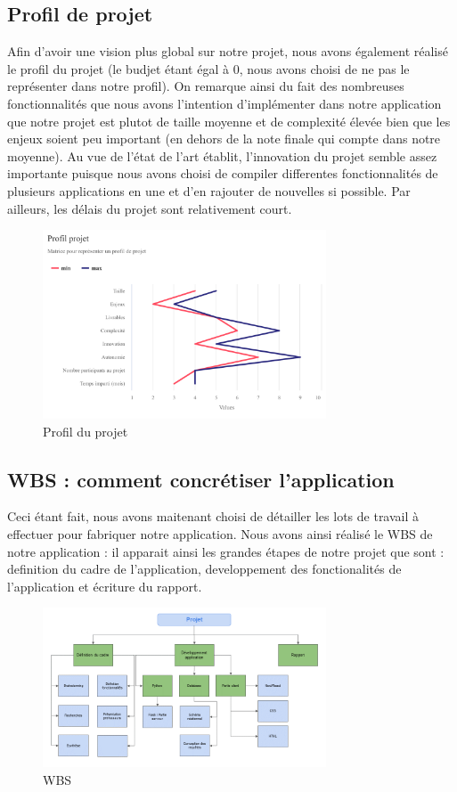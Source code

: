 \documentclass[french,a4paper]{article}
\begin{document}
\subsection{Profil de projet}
Afin d’avoir une vision plus global sur notre projet, nous avons également réalisé le profil du projet (le budjet étant égal à 0, nous avons choisi de ne pas le représenter dans notre profil). On remarque ainsi du fait des nombreuses fonctionnalités que nous avons l’intention d’implémenter dans notre application que notre projet est plutot de taille moyenne et de complexité élevée bien que les enjeux soient peu important (en dehors de la note finale qui compte dans notre moyenne). Au vue de l’état de l’art établit, l’innovation du projet semble assez importante puisque nous avons choisi de compiler differentes fonctionnalités de plusieurs applications en une et d’en rajouter de nouvelles si possible. Par ailleurs, les délais du projet sont relativement court.
\begin{figure}[H]
    \centering
    \includegraphics[width=0.75\textwidth]{img/profil_projet.png}
    \caption{Profil du projet}
\end{figure} 

\subsection{WBS : comment concrétiser l’application}
Ceci étant fait, nous avons maitenant choisi de détailler les lots de travail à effectuer pour fabriquer notre application. Nous avons ainsi réalisé le WBS de notre application : il apparait ainsi les grandes étapes de notre projet que sont : definition du cadre de l’application, developpement des fonctionalités de l’application et écriture du rapport.
\begin{figure}[H]
    \centering
    \includegraphics[width=0.75\textwidth]{img/WBS.png}
    \caption{WBS}
\end{figure} 
\end{document}
